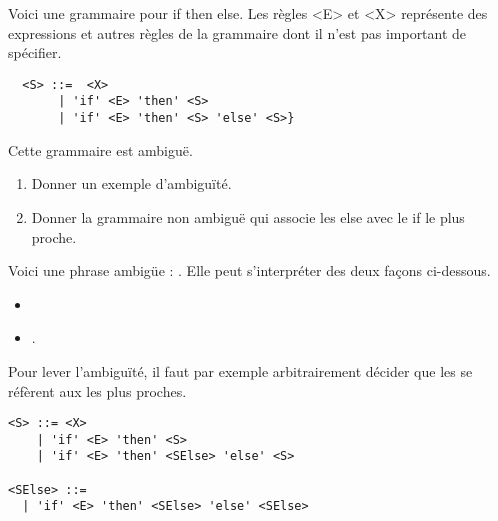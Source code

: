 \begin{Exercise}
  \label{ex:if_then_else}
Voici une grammaire pour if then else. Les règles <E> et <X>
représente des expressions et autres règles de la grammaire dont il
n'est pas important de spécifier.
\begin{verbatim}
  <S> ::=  <X>
       | 'if' <E> 'then' <S>
       | 'if' <E> 'then' <S> 'else' <S>} 
\end{verbatim}

Cette grammaire est ambiguë. 
\begin{enumerate}
\item Donner un exemple d'ambiguïté.
\item Donner la grammaire non ambiguë qui associe les else avec le if
  le plus proche.
\end{enumerate}
\end{Exercise}

\begin{Answer}[ref={ex:if_then_else}]
  Voici une phrase ambigüe : . Elle
  peut s'interpréter des deux façons ci-dessous.

  \begin{itemize}
  \item {}
  \item {}.
  \end{itemize}
    
  Pour lever l'ambiguïté, il faut par exemple arbitrairement décider que les
   se réfèrent aux  les plus proches.

\begin{verbatim}
<S> ::= <X>
    | 'if' <E> 'then' <S>
    | 'if' <E> 'then' <SElse> 'else' <S>

<SElse> ::=
  | 'if' <E> 'then' <SElse> 'else' <SElse>
\end{verbatim}
\end{Answer}